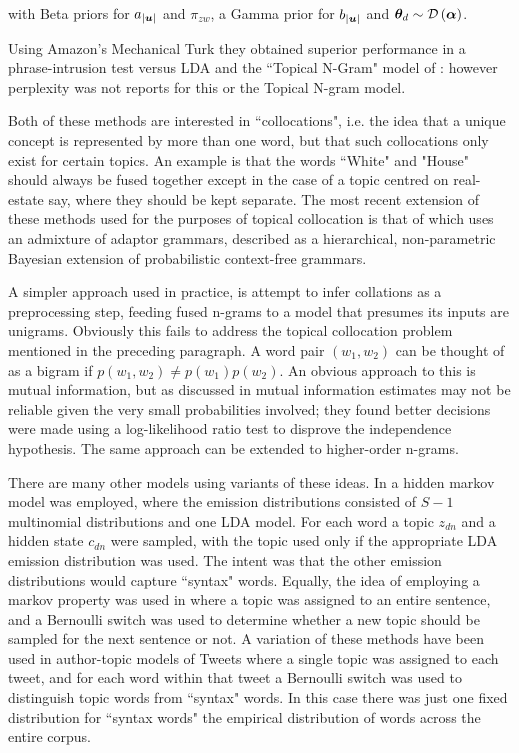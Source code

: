 with Beta priors for $a_{|\bm u|}$ and $\pi_{zw}$, a Gamma prior for  $b_{|\bm u|}$ and ${ \bm \theta_d } \sim \mathcal{D} \left( {\bm \alpha} \right)$.

Using Amazon's Mechanical Turk they obtained superior performance in a phrase-intrusion test versus LDA and the ``Topical N-Gram" model of \cite{Wang2007}: however perplexity was not reports for this or the Topical N-gram model.

Both of these methods are interested in ``collocations", i.e. the idea that a unique concept is represented by more than one word, but that such collocations only exist for certain topics. An example is that the words ``White" and "House" should always be fused together except in the case of a topic centred on real-estate say, where they should be kept separate. The most recent extension of these methods used for the purposes of topical collocation is that of \cite{Johnson2010} which uses an admixture of adaptor grammars, described as a hierarchical, non-parametric Bayesian extension of probabilistic context-free grammars. 

A simpler approach used in practice, is attempt to infer collations as a preprocessing step, feeding fused n-grams to a model that presumes its inputs are unigrams. Obviously this fails to address the topical collocation problem mentioned in the preceding paragraph. A word pair $\left(w_1, w_2\right)$ can be thought of as a bigram if $p(w_1, w_2) \neq p(w_1)p(w_2)$. An obvious approach to this is mutual information, but as discussed in \cite{Dunning1993} mutual information estimates may not be reliable given the very small probabilities involved; they found better decisions were made using a log-likelihood ratio test to disprove the independence hypothesis. The same approach can be extended to higher-order n-grams.

There are many other models using variants of these ideas. In \cite{Griffiths2005} a hidden markov model was employed, where the emission distributions consisted of $S-1$ multinomial distributions and one LDA model. For each word a topic $z_{dn}$ and a hidden state $c_{dn}$ were sampled, with the topic used only if the appropriate LDA emission distribution was used. The intent was that the other emission distributions would capture ``syntax" words. Equally, the idea of employing a markov property was used in \cite{Gruber2007} where a topic was assigned to an entire sentence, and a Bernoulli switch was used to determine whether a new topic should be sampled for the next sentence or not. A variation of these methods have been used in author-topic models of Tweets\cite{Zhao2011}\cite{Zhao2011a} where a single topic was assigned to each tweet, and for each word within that tweet a Bernoulli switch was used to distinguish topic words from ``syntax" words. In this case there was just one fixed distribution for ``syntax words" the empirical distribution of words across the entire corpus.




